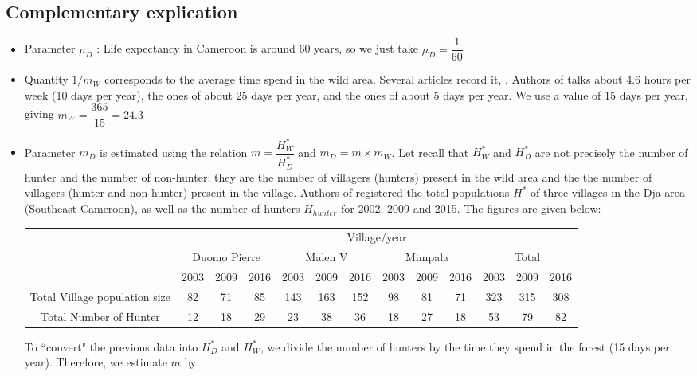 \documentclass{article}
\begin{document}
\subsection{Complementary explication}
\begin{itemize}

\item Parameter $\mu_D$ : Life expectancy in Cameroon is around 60 years, so we just take $\mu_D = \dfrac{1}{60}$

\item Quantity $1/m_W$ corresponds to the average time spend in the wild area. Several articles record it, \cite{avila_interpreting_2019, jones_incentives_2019, jones_consequences_2020}. Authors of \cite{avila_interpreting_2019} talks about 4.6 hours per week (10 days per year), the ones of \cite{jones_incentives_2019} about 25 days per year, and the ones of \cite{jones_consequences_2020} about 5 days per year. We use a value of 15 days per year, giving $m_W = \dfrac{365}{15} = 24.3$

\item Parameter $m_D$ is estimated using the relation $m = \dfrac{H_W^*}{H_D^*}$ and $m_D = m \times m_W$. Let recall that $H_W^*$ and $H_D^*$ are not precisely the number of hunter and the number of non-hunter; they are the number of villagers (hunters) present in the wild area and the the number of villagers (hunter and non-hunter) present in the village. 
Authors of \cite{avila_interpreting_2019} registered the total populations $H^*$ of three villages in the Dja area (Southeast Cameroon), as well as the number of hunters $H_{hunter}$ for 2002, 2009 and 2015. The figures are given below:

\begin{table}[ht]
\centering
\begin{tabular}{c|ccc|ccc|ccc|ccc}
& \multicolumn{12}{c}{Village/year} \\
& \multicolumn{3}{c|}{Duomo Pierre} & \multicolumn{3}{c|}{Malen V} & \multicolumn{3}{c|}{Mimpala} & \multicolumn{3}{c}{Total} \\
& 2003 & 2009 & 2016  & 2003 & 2009 & 2016 & 2003 & 2009 & 2016 & 2003 & 2009 & 2016 \\
Total Village population size & 82 & 71 &85&143&163&152&98&81&71&323&315&308 \\
Total Number of Hunter & 12 & 18 & 29& 23&38&36&18&27&18&53&79&82
\end{tabular}
\end{table}

To ``convert" the previous data into $H_D^*$ and $H_W^*$, we divide the number of hunters by the time they spend in the forest (15 days per year). Therefore, we estimate $m$ by:


\end{itemize}
\end{document}
